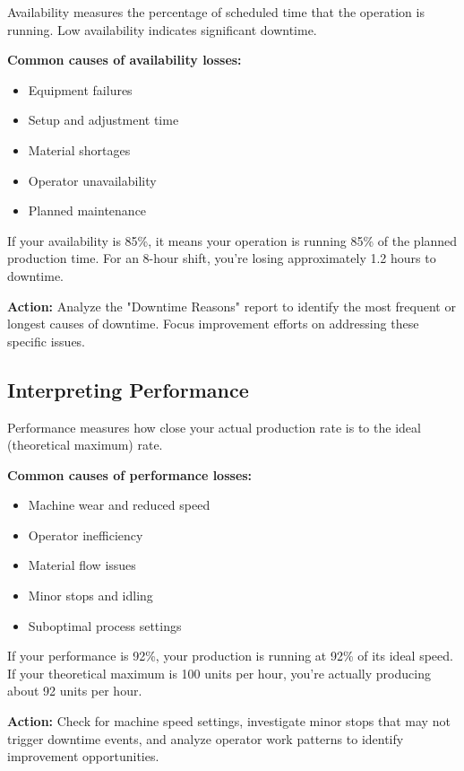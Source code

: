 \documentclass[12pt,a4paper]{report}
\begin{document}
Availability measures the percentage of scheduled time that the operation is running. Low availability indicates significant downtime.

\textbf{Common causes of availability losses:}
\begin{itemize}
    \item Equipment failures
    \item Setup and adjustment time
    \item Material shortages
    \item Operator unavailability
    \item Planned maintenance
\end{itemize}

\begin{tcolorbox}[colback=tuliplightgray,colframe=tulipblue,title=Example Analysis]
If your availability is 85\%, it means your operation is running 85\% of the planned production time. For an 8-hour shift, you're losing approximately 1.2 hours to downtime.

\textbf{Action:} Analyze the "Downtime Reasons" report to identify the most frequent or longest causes of downtime. Focus improvement efforts on addressing these specific issues.
\end{tcolorbox}

\subsection{Interpreting Performance}

Performance measures how close your actual production rate is to the ideal (theoretical maximum) rate.

\textbf{Common causes of performance losses:}
\begin{itemize}
    \item Machine wear and reduced speed
    \item Operator inefficiency
    \item Material flow issues
    \item Minor stops and idling
    \item Suboptimal process settings
\end{itemize}

\begin{tcolorbox}[colback=tuliplightgray,colframe=tulipblue,title=Example Analysis]
If your performance is 92\%, your production is running at 92\% of its ideal speed. If your theoretical maximum is 100 units per hour, you're actually producing about 92 units per hour.

\textbf{Action:} Check for machine speed settings, investigate minor stops that may not trigger downtime events, and analyze operator work patterns to identify improvement opportunities.
\end{tcolorbox}
\end{document}
